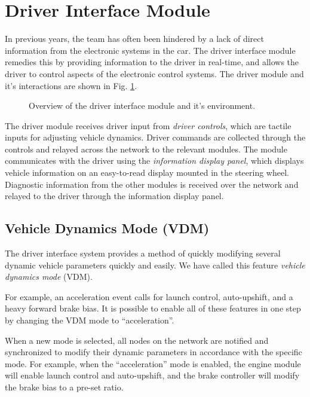 \section{Driver Interface Module\label{sec:Driver-Interface-Module}}

In previous years, the team has often been hindered by a lack of direct information from the electronic systems in the car. The driver interface module remedies this by providing information to the driver in real-time, and allows the driver to control aspects of the electronic control systems. The driver module and it's interactions are shown in Fig. \ref{fig:design_interface_overview_block}.

\begin{figure}[H]
	\centering
	
	\caption{Overview of the driver interface module and it's environment.}
	\label{fig:design_interface_overview_block}
\end{figure}

The driver module receives driver input from \emph{driver controls}, which are tactile inputs for adjusting vehicle dynamics. Driver commands are collected through the controls and relayed across the network to the relevant modules. The module communicates with the driver using the \emph{information display panel}, which displays vehicle information on an easy-to-read display mounted in the steering wheel. Diagnostic information from the other modules is received over the network and relayed to the driver through the information display panel. 

\subsection{Vehicle Dynamics Mode (VDM)}

The driver interface system provides a method of quickly modifying several dynamic vehicle parameters quickly and easily. We have called this feature \emph{vehicle dynamics mode} (VDM). 

For example, an acceleration event calls for launch control, auto-upshift, and a heavy forward brake bias. It is possible to enable all of these features in one step by changing the VDM mode to {}``acceleration''. 

When a new mode is selected, all nodes on the network are notified and synchronized to modify their dynamic parameters in accordance with the specific mode. For example, when the  {}``acceleration'' mode is enabled, the engine module will enable launch control and auto-upshift, and the brake controller will modify the brake bias to a pre-set ratio.

